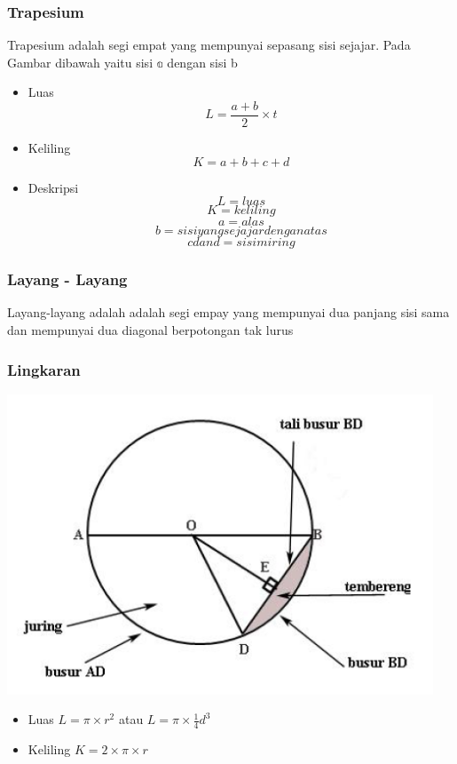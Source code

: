 \documentclass[12pt]{article}
\begin{document}
			\subsubsection{Trapesium}
			Trapesium adalah segi empat yang mempunyai sepasang sisi sejajar. Pada Gambar dibawah yaitu sisi $\mathbb{a}$ dengan sisi b
			\begin{itemize}
			
			\item Luas
			$$L=\frac{a+b}{2}\times t$$
			\item Keliling
			$$K=a+b+c+d$$
			\item Deskripsi
			$$L=luas$$
			$$K=keliling$$
			$$a=alas$$
			$$b=sisi yang sejajar dengan atas$$
			$$c dan d = sisi miring$$
			\end{itemize}
			\subsubsection{Layang - Layang}
			Layang-layang adalah adalah segi empay yang mempunyai dua panjang sisi sama dan mempunyai dua diagonal berpotongan tak lurus
			\subsubsection{Lingkaran}
			\includegraphics[width=5in]{rumus-keliling-lingkaran-dan-contoh-soalnya.png}
			\begin{itemize}
			\item Luas
			$L=\pi \times r^2$ atau $L=\pi \times \frac{1}{4} d^3$
			\item Keliling
			$K=2\times \pi \times r$
			\end{itemize}
\end{document}
